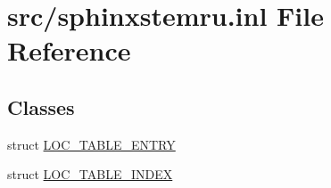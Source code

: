 \hypertarget{sphinxstemru_8inl}{\section{src/sphinxstemru.inl File Reference}
\label{sphinxstemru_8inl}
}
\subsection*{Classes}
\begin{DoxyCompactItemize}
\item 
struct \hyperlink{structLOC__TABLE__ENTRY}{L\-O\-C\-\_\-\-T\-A\-B\-L\-E\-\_\-\-E\-N\-T\-R\-Y}
\item 
struct \hyperlink{structLOC__TABLE__INDEX}{L\-O\-C\-\_\-\-T\-A\-B\-L\-E\-\_\-\-I\-N\-D\-E\-X}
\end{DoxyCompactItemize}
